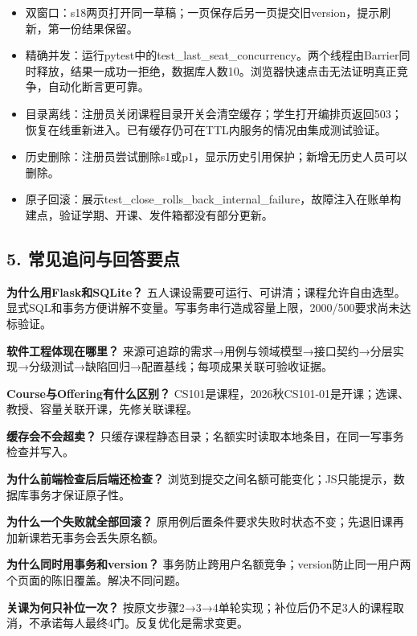 \documentclass[UTF8,11pt,a4paper]{ctexart}
\providecommand{\tightlist}{\setlength{\itemsep}{0pt}\setlength{\parskip}{0pt}}
\begin{document}
\begin{itemize}
\tightlist
\item
  双窗口：s18两页打开同一草稿；一页保存后另一页提交旧version，提示刷新，第一份结果保留。
\item
  精确并发：运行pytest中的test\_\allowbreak{}last\_\allowbreak{}seat\_\allowbreak{}concurrency。两个线程由Barrier同时释放，结果一成功一拒绝，数据库人数10。浏览器快速点击无法证明真正竞争，自动化断言更可靠。
\item
  目录离线：注册员关闭课程目录开关会清空缓存；学生打开编排页返回503；恢复在线重新进入。已有缓存仍可在TTL内服务的情况由集成测试验证。
\item
  历史删除：注册员尝试删除s1或p1，显示历史引用保护；新增无历史人员可以删除。
\item
  原子回滚：展示test\_\allowbreak{}close\_\allowbreak{}rolls\_\allowbreak{}back\_\allowbreak{}internal\_\allowbreak{}failure，故障注入在账单构建点，验证学期、开课、发件箱都没有部分更新。
\end{itemize}

\hypertarget{5-ux5e38ux89c1ux8ffdux95eeux4e0eux56deux7b54ux8981ux70b9}{%
\subsection{5.
常见追问与回答要点}\label{5-ux5e38ux89c1ux8ffdux95eeux4e0eux56deux7b54ux8981ux70b9}}

\textbf{为什么用Flask和SQLite？}
五人课设需要可运行、可讲清；课程允许自由选型。显式SQL和事务方便讲解不变量。写事务串行造成容量上限，2000/500要求尚未达标验证。

\textbf{软件工程体现在哪里？}
来源可追踪的需求→用例与领域模型→接口契约→分层实现→分级测试→缺陷回归→配置基线；每项成果关联可验收证据。

\textbf{Course与Offering有什么区别？}
CS101是课程，2026秋CS101-01是开课；选课、教授、容量关联开课，先修关联课程。

\textbf{缓存会不会超卖？}
只缓存课程静态目录；名额实时读取本地条目，在同一写事务检查并写入。

\textbf{为什么前端检查后后端还检查？}
浏览到提交之间名额可能变化；JS只能提示，数据库事务才保证原子性。

\textbf{为什么一个失败就全部回滚？}
原用例后置条件要求失败时状态不变；先退旧课再加新课若无事务会丢失原名额。

\textbf{为什么同时用事务和version？}
事务防止跨用户名额竞争；version防止同一用户两个页面的陈旧覆盖。解决不同问题。

\textbf{关课为何只补位一次？}
按原文步骤2→3→4单轮实现；补位后仍不足3人的课程取消，不承诺每人最终4门。反复优化是需求变更。
\end{document}

